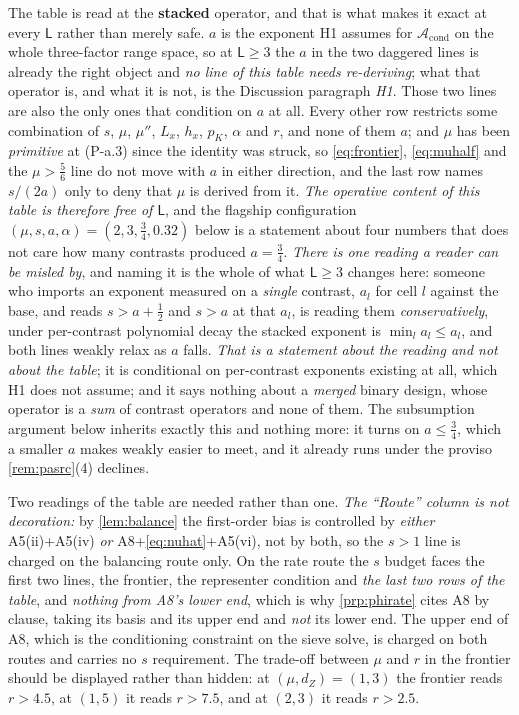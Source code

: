 \noindent The table is read at the \textbf{stacked} operator, and that is what makes it exact at every
$\mathsf L$ rather than merely safe. $a$ is the exponent H1 assumes for $\mathcal A_{\mathrm{cond}}$ on
the whole three-factor range space, so at $\mathsf L\ge3$ the $a$ in the two daggered lines is already the
right object and \emph{no line of this table needs re-deriving}; what that operator is, and what it is
not, is the Discussion paragraph \emph{H1}. Those two lines are also the only ones that condition on
$a$ at all. Every other row restricts some combination of $s$, $\mu$, $\mu''$, $L_x$, $h_x$, $p_K$,
$\alpha$ and $r$, and none of them $a$; and $\mu$ has been
\emph{primitive} at (P-a.3) since the identity was struck, so \eqref{eq:frontier}, \eqref{eq:muhalf}
and the $\mu>\tfrac56$ line do not move with $a$ in either direction, and the last row names $s/(2a)$ only
to deny that $\mu$ is derived from it. \emph{The operative content of this table is therefore free of
$\mathsf L$}, and the flagship configuration $(\mu,s,a,\alpha)=(2,3,\tfrac34,0.32)$ below is a statement
about four numbers that does not care how many contrasts produced $a=\tfrac34$.
\emph{There is one reading a reader can be misled by}, and naming it is the whole of what
$\mathsf L\ge3$ changes here: someone who imports an exponent measured on a \emph{single} contrast, $a_l$
for cell $l$ against the base, and reads $s>a+\tfrac12$ and $s>a$ at that $a_l$, is reading them
\emph{conservatively}, under per-contrast polynomial decay the stacked exponent is
$\min_la_l\le a_l$, and both lines weakly relax as $a$ falls. \emph{That is a statement about the reading
and not about the table}; it is conditional on per-contrast exponents existing at all, which H1 does not
assume; and it says nothing about a \emph{merged} binary design, whose operator is a \emph{sum} of
contrast operators and none of them. The subsumption argument below inherits exactly this and nothing
more: it turns on $a\le\tfrac34$, which a smaller $a$ makes weakly easier to meet, and it already runs
under the proviso \cref{rem:pasrc}\textup{(4)} declines.

\noindent Two readings of the table are needed rather than one. \emph{The ``Route'' column is not decoration:} by
\cref{lem:balance} the first-order bias is controlled by \emph{either} A5(ii)+A5(iv) \emph{or}
A8+\eqref{eq:nuhat}+A5(vi), not by both, so the $s>1$ line is charged on the balancing route only. On the
rate route the $s$ budget faces the first two lines, the frontier, the representer condition and
\emph{the last two rows of the table}, and \emph{nothing from A8's lower end}, which is why
\cref{prp:phirate} cites A8 by clause, taking its basis and its upper end and \emph{not} its lower end.
The upper end of A8, which is the conditioning constraint on the
sieve solve, is charged on both routes and carries no $s$ requirement. The trade-off between
$\mu$ and $r$ in the frontier should be displayed rather than hidden: at
$(\mu,d_Z)=(1,3)$ the frontier reads $r>4.5$, at $(1,5)$ it reads $r>7.5$, and at $(2,3)$ it reads
$r>2.5$.

